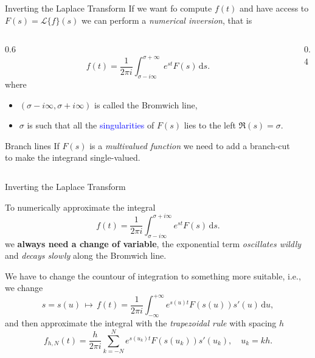 \documentclass[aspectratio=169,xcolor=dvipsnames]{beamer}
\begin{document}
\begin{frame}[fragile]{Inverting the Laplace Transform}
If we want fo compute $f(t)$ and have access to $F(s) = \mathcal{L}\{f\}(s)$ we can perform a \emph{numerical inversion}, that is
\begin{columns}
\begin{column}{0.6\columnwidth}
\[
f(t) = \frac{1}{2 \pi i} \int_{\sigma - i \infty}^{\sigma + \infty} e^{st} F(s)\,\textrm{d}s.
\]
where 
\begin{itemize}
	\item $(\sigma - i \infty,\sigma + i \infty)$ is called the \alert{Bromwich line},
	\item $\sigma$ is such that all the \textcolor{blue}{singularities} of $F(s)$ lies to the left $\Re{(s)} = \sigma$.
\end{itemize}
\begin{exampleblock}{\faExclamationTriangle\;Branch lines}
If $F(s)$ is a \emph{multivalued function} we need to add a branch-cut to make the integrand single-valued.
\end{exampleblock}
\end{column}
\begin{column}{0.4\columnwidth}
\end{column}
\end{columns}


\end{frame}

\begin{frame}[fragile]{Inverting the Laplace Transform}

To numerically approximate the integral 
\[
f(t) = \frac{1}{2 \pi i} \int_{\sigma - i \infty}^{\sigma + i \infty} e^{st} F(s)\,\textrm{d}s.
\]
we \textbf{always need a change of variable}, the exponential term \emph{oscillates wildly} and \emph{decays slowly} along the Bromwich line. 

We have to \alert{change the countour of integration} to something more suitable, i.e., we change
\[
s = s(u) \,\mapsto\, f(t) = \frac{1}{2\pi i} \int_{-\infty}^{+\infty} e^{s(u)t} F(s(u))s'(u)\,\textrm{d}u,
\]
and then approximate the integral with the \emph{trapezoidal rule} with spacing $h$
\[
f_{h,N}(t) = \frac{h}{2\pi i} \sum_{k=-N}^{N} e^{s(u_k)t} F(s(u_k)) s'(u_k), \quad u_k = kh. 
\]
\end{frame}
\end{document}
